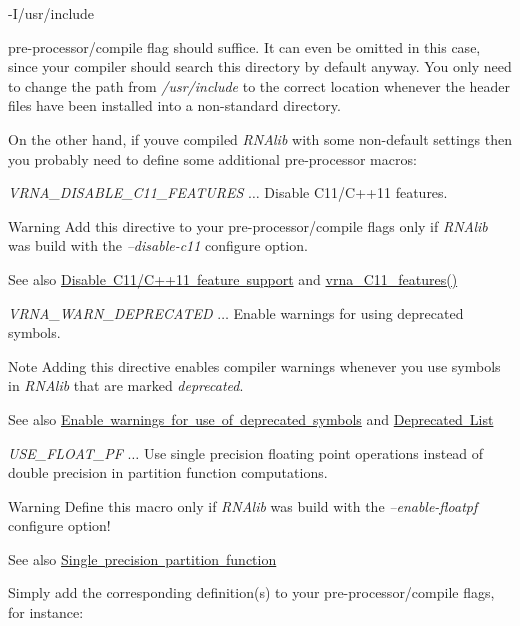 \begin{DoxyVerb}-I/usr/include
\end{DoxyVerb}


pre-\/processor/compile flag should suffice. It can even be omitted in this case, since your compiler should search this directory by default anyway. You only need to change the path from {\itshape /usr/include} to the correct location whenever the header files have been installed into a non-\/standard directory.

On the other hand, if you\textquotesingle{}ve compiled {\itshape R\+N\+Alib} with some non-\/default settings then you probably need to define some additional pre-\/processor macros\+:


\begin{DoxyItemize}
\item {\itshape V\+R\+N\+A\+\_\+\+D\+I\+S\+A\+B\+L\+E\+\_\+\+C11\+\_\+\+F\+E\+A\+T\+U\+R\+ES} $\ldots$ Disable C11/\+C++11 features. \begin{DoxyWarning}{Warning}
Add this directive to your pre-\/processor/compile flags only if {\itshape R\+N\+Alib} was build with the {\itshape --disable-\/c11} configure option. 
\end{DoxyWarning}
\begin{DoxySeeAlso}{See also}
\mbox{\hyperlink{install_config_c11}{Disable C11/\+C++11 feature support}} and \mbox{\hyperlink{group__data__structures_ga21744ae2d6a17309f9327d3547cef0cb}{vrna\+\_\+\+C11\+\_\+features()}}
\end{DoxySeeAlso}

\item {\itshape V\+R\+N\+A\+\_\+\+W\+A\+R\+N\+\_\+\+D\+E\+P\+R\+E\+C\+A\+T\+ED} $\ldots$ Enable warnings for using deprecated symbols. \begin{DoxyNote}{Note}
Adding this directive enables compiler warnings whenever you use symbols in {\itshape R\+N\+Alib} that are marked {\itshape deprecated}. 
\end{DoxyNote}
\begin{DoxySeeAlso}{See also}
\mbox{\hyperlink{install_config_deprecated}{Enable warnings for use of deprecated symbols}} and \mbox{\hyperlink{deprecated}{Deprecated List}}
\end{DoxySeeAlso}

\item {\itshape U\+S\+E\+\_\+\+F\+L\+O\+A\+T\+\_\+\+PF} $\ldots$ Use single precision floating point operations instead of double precision in partition function computations. \begin{DoxyWarning}{Warning}
Define this macro only if {\itshape R\+N\+Alib} was build with the {\itshape --enable-\/floatpf} configure option! 
\end{DoxyWarning}
\begin{DoxySeeAlso}{See also}
\mbox{\hyperlink{install_config_float_pf}{Single precision partition function}}
\end{DoxySeeAlso}

\end{DoxyItemize}Simply add the corresponding definition(s) to your pre-\/processor/compile flags, for instance\+:

